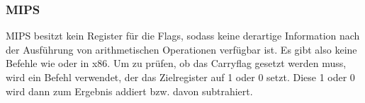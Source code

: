 \subsubsection{MIPS}


MIPS besitzt kein Register für die Flags, sodass keine derartige Information nach der Ausführung von arithmetischen
Operationen verfügbar ist.
Es gibt also keine Befehle wie  oder  in x86.
Um zu prüfen, ob das Carryflag gesetzt werden muss, wird ein  Befehl verwendet, der das Zielregister auf 1
oder 0 setzt. Diese 1 oder 0 wird dann zum Ergebnis addiert bzw. davon subtrahiert.

